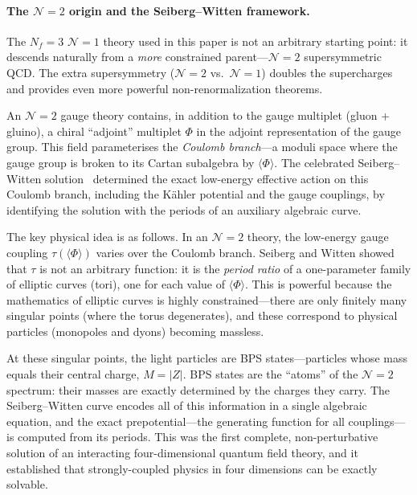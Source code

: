 \documentclass[12pt,a4paper]{article}
\newcommand{\Nf}{N_f}
\begin{document}
\paragraph{The $\mathcal{N}=2$ origin and the Seiberg--Witten framework.}
The $\Nf=3$ $\mathcal{N}=1$ theory used in this paper is not
an arbitrary starting point: it descends naturally from a
\emph{more} constrained parent---$\mathcal{N}=2$ supersymmetric
QCD. The extra supersymmetry ($\mathcal{N}=2$ vs.\ $\mathcal{N}=1$)
doubles the supercharges and provides even more powerful
non-renormalization theorems.

An $\mathcal{N}=2$ gauge theory contains, in addition to the
gauge multiplet (gluon + gluino), a chiral ``adjoint'' multiplet
$\Phi$ in the adjoint representation of the gauge group. This field
parameterises the \emph{Coulomb branch}---a moduli space where the
gauge group is broken to its Cartan subalgebra by $\langle\Phi\rangle$.
The celebrated Seiberg--Witten
solution~\cite{SeibergWitten:1994a,SeibergWitten:1994b}
determined the exact low-energy effective action on this Coulomb
branch, including the K\"ahler potential and the gauge
couplings, by identifying the solution with the periods of an
auxiliary algebraic curve.

The key physical idea is as follows. In an $\mathcal{N}=2$ theory,
the low-energy gauge coupling $\tau(\langle\Phi\rangle)$ varies
over the Coulomb branch. Seiberg and Witten showed that $\tau$ is
not an arbitrary function: it is the \emph{period ratio} of a
one-parameter family of elliptic curves (tori), one for each value
of $\langle\Phi\rangle$. This is powerful because the mathematics of
elliptic curves is highly constrained---there are only finitely many
singular points (where the torus degenerates), and these correspond
to physical particles (monopoles and dyons) becoming massless.

At these singular points, the light particles are BPS
states---particles whose mass equals their central charge,
$M = |Z|$. BPS states are the ``atoms'' of the $\mathcal{N}=2$
spectrum: their masses are exactly determined by the charges they
carry. The Seiberg--Witten curve encodes all of this information
in a single algebraic equation, and the exact prepotential---the
generating function for all couplings---is computed from its periods.
This was the first complete, non-perturbative solution of an
interacting four-dimensional quantum field theory, and it
established that strongly-coupled physics in four dimensions
can be exactly solvable.
\end{document}
